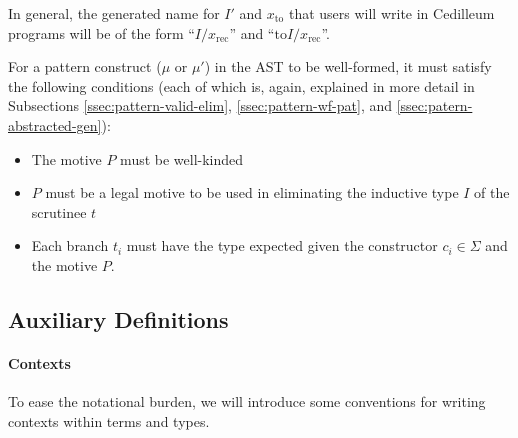 \documentclass{article}
\begin{document}
\noindent In general, the generated name for $I'$ and $x_{\text{to}}$ that users
will write in Cedilleum programs will be of the form ``$I\text{/}x_{\text{rec}}$''
and ``$\text{to}I\text{/}x_{\text{rec}}$''.

For a pattern construct ($\mu$ or $\mu'$) in the AST to be well-formed, it must satisfy the
following conditions (each of which is, again, explained in more detail in
Subsections \ref{ssec:pattern-valid-elim}, \ref{ssec:pattern-wf-pat}, and
\ref{ssec:patern-abstracted-gen}):

\begin{itemize}
\item The motive $P$ must be well-kinded
\item $P$ must be a legal motive to be used in eliminating the inductive type
  $I$ of the scrutinee $t$
\item Each branch $t_i$ must have the type expected given the constructor $c_i
  \in \Sigma$ and the motive $P$.
\end{itemize}

\subsection{Auxiliary Definitions}
\label{ssec:inductive-aux-defs}

\paragraph{Contexts}
To ease the notational burden, we will introduce some conventions for writing
contexts within terms and types.
\end{document}
